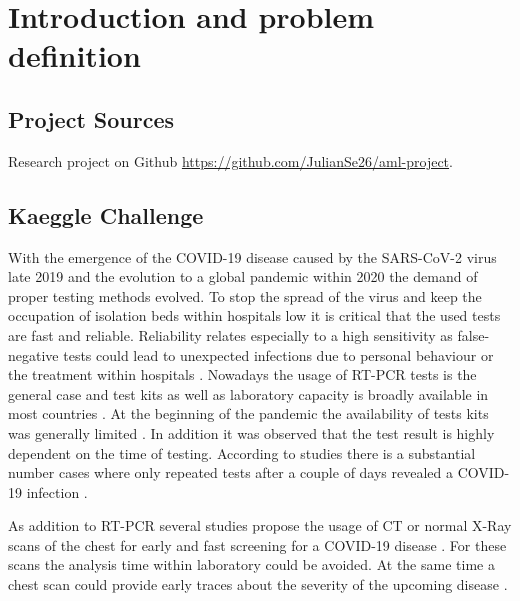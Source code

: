 

\chapter{Introduction and problem definition}\label{chapter:intro}

\section*{Project Sources}
Research project on Github \url{https://github.com/JulianSe26/aml-project}.

\section{Kaeggle Challenge}\label{sec:kaggle}
With the emergence of the COVID-19 disease caused by the SARS-CoV-2 virus late 2019 \autocite{huang2020clinical} and the evolution to a global pandemic within 2020 the demand of proper testing methods evolved. To stop the spread of the virus and keep the occupation of isolation beds within hospitals low it is critical that the used tests are fast and reliable. Reliability relates especially to a high sensitivity as false-negative tests could lead to unexpected infections due to personal behaviour or the treatment within hospitals \autocite{west2020covid}. Nowadays the usage of \ac{RT-PCR} tests is the general case and test kits as well as laboratory capacity is broadly available in most countries \autocite{vankasteren2020104412}. At the beginning of the pandemic the availability of tests kits was generally limited \autocite{Tannem1090}. In addition it was observed that the test result is highly dependent on the time of testing. According to studies there is a substantial number cases where only repeated tests after a couple of days revealed a COVID-19 infection \autocite{arevalo2020false}.

As addition to \ac{RT-PCR} several studies propose the usage of \ac{CT} or normal X-Ray scans of the chest for early and fast screening for a COVID-19 disease \autocite{fang2020sensitivity,xie2020chest}. For these scans the analysis time within laboratory could be avoided. At the same time a chest scan could provide early traces about the severity of the upcoming disease \autocite{yasin2020chest}. 

